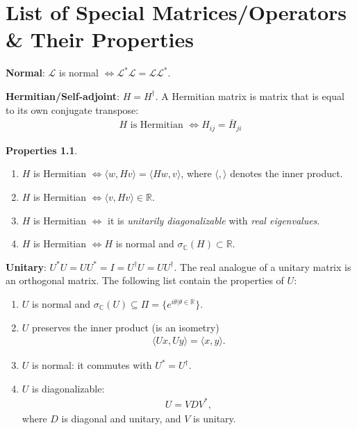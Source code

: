 \documentclass{book}
\theoremstyle{definition}
\newtheorem{prop}{Properties}[section]
\newcommand{\R}{\mathbb{R}}
\newcommand{\C}{\mathbb{C}}
\newcommand{\lag}{\mathcal{L}}
\begin{document}
\newpage
\tableofcontents
\newpage

\chapter{List of Special Matrices/Operators \& Their Properties}
\begin{enumerate}
	\item \textbf{Normal}: $\lag$ is normal $\iff \lag^*\lag = \lag\lag^*$.    
	
	\item \textbf{Hermitian/Self-adjoint}: $H = H^\dagger$. A Hermitian matrix is matrix that is equal to its own conjugate transpose:
	\begin{align*}
	H \text{ is Hermitian } \iff H_{ij} = \bar{H}_{ji}
	\end{align*} 
	\begin{prop}
	$\,$
	\begin{enumerate}
		\item $H$ is Hermitian $ \iff \langle w, Hv\rangle = \langle Hw, v \rangle$, where $\langle, \rangle$ denotes the inner product.
		\item $H$ is Hermitian $ \iff \langle v, Hv\rangle \in \R$.
		\item $H$ is Hermitian $\iff$ it is \textit{unitarily diagonalizable} with \textit{real eigenvalues}.
		\item $H$ is Hermitian $\iff H$ is normal and $ \sigma_\C (H) \subset \R$.
	\end{enumerate}
	\item \textbf{Unitary}: $U^*U = UU^* = I = U^\dagger U = UU^\dagger$. The real analogue of a unitary matrix is an orthogonal matrix. The following list contain the properties of $U$:
	\begin{enumerate}
		
		\item $U$ is normal and $\sigma_\C(U) \subseteq \Pi = \{ e^{i\theta \vert \theta \in \R} \}$.
		
		\item $U$ preserves the inner product (is an isometry)
		\begin{align*}
		\langle Ux, Uy \rangle = \langle x,y\rangle.
		\end{align*}
		
		\item $U$ is normal: it commutes with $U^* = U^\dagger$.
		
		\item $U$ is diagonalizable:
		\begin{align*}
		U = VDV^*,
		\end{align*}
		where $D$ is diagonal and unitary, and $V$ is unitary.
		

\end{enumerate}
\end{prop}
\end{enumerate}
\end{document}

